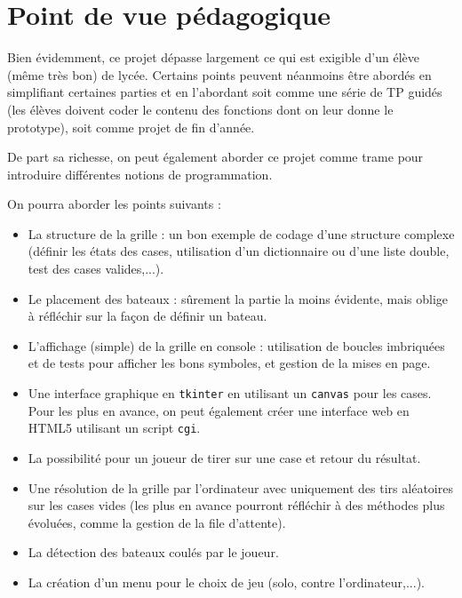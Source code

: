 \chapter{Point de vue pédagogique}

Bien évidemment, ce projet dépasse largement ce qui est exigible d'un élève (même très bon) de lycée. Certains points peuvent néanmoins être abordés en simplifiant certaines parties et en l'abordant soit comme une série de TP guidés (les élèves doivent coder le contenu des fonctions dont on leur donne le prototype), soit comme projet de fin d'année. 

De part sa richesse, on peut également aborder ce projet comme trame pour introduire différentes notions de programmation. 

\medskip

On pourra aborder les points suivants :
\begin{itemize}
\item La structure de la grille : un bon exemple de codage d'une structure complexe (définir les états des cases, utilisation d'un dictionnaire ou d'une liste double, test des cases valides,...).
\item Le placement des bateaux : sûrement la partie la moins évidente, mais oblige à réfléchir sur la façon de définir un bateau.
\item L'affichage (simple) de la grille en console : utilisation de boucles imbriquées et de tests pour afficher les bons symboles, et gestion de la mises en page.
\item Une interface graphique en \texttt{tkinter} en utilisant un \texttt{canvas} pour les cases. Pour les plus en avance, on peut également créer une interface web en HTML5 utilisant un script \texttt{cgi}.
\item La possibilité pour un joueur de tirer sur une case et retour du résultat.
\item Une résolution de la grille par l'ordinateur avec uniquement des tirs aléatoires sur les cases vides (les plus en avance pourront réfléchir à des méthodes plus évoluées, comme la gestion de la file d'attente).
\item La détection des bateaux coulés par le joueur.
\item La création d'un menu pour le choix de jeu (solo, contre l'ordinateur,...).
\end{itemize}

\medskip

